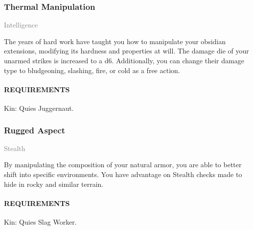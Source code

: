     \subsubsection{Thermal Manipulation} \label{tal::thermalmanipulation}
    \small{\textcolor{gray}{Intelligence}}

    \normalsize
    The years of hard work have taught you how to manipulate your obsidian extensions, modifying its hardness and properties at will.
    The damage die of your unarmed strikes is increased to a d6.
    Additionally, you can change their damage type to bludgeoning, slashing, fire, or cold as a free action.
    \paragraph{REQUIREMENTS} Kin: Quies Juggernaut.

    \subsubsection{Rugged Aspect} \label{tal::ruggedaspect}
    \small{\textcolor{gray}{Stealth}}

    \normalsize
    By manipulating the composition of your natural armor, you are able to better shift into specific environments.
    You have advantage on Stealth checks made to hide in rocky and similar terrain.
    \paragraph{REQUIREMENTS} Kin: Quies Slag Worker.




